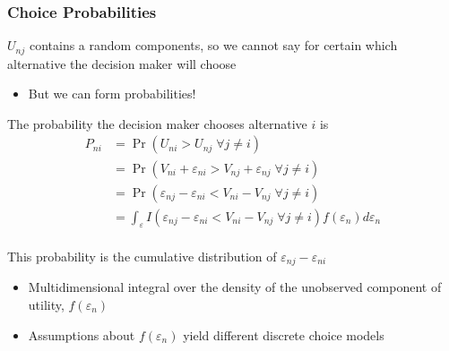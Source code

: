 \documentclass{beamer}
\begin{document}
\begin{frame}\frametitle{Choice Probabilities}
    $U_{nj}$ contains a random components, so we cannot say for certain which alternative the decision maker will choose
    \begin{itemize}
    	\item But we can form probabilities!
    \end{itemize}
    \vspace{1ex}
    The probability the decision maker chooses alternative $i$ is
    \begin{align*}
    	P_{ni} &= \Pr(U_{ni} > U_{nj} \; \forall j \neq i) \\
    	&= \Pr(V_{ni} + \varepsilon_{ni} > V_{nj} + \varepsilon_{nj} \; \forall j \neq i) \\
    	&= \Pr(\varepsilon_{nj} - \varepsilon_{ni} < V_{ni} - V_{nj} \; \forall j \neq i) \\
    	&= \int_\varepsilon I(\varepsilon_{nj} - \varepsilon_{ni} < V_{ni} - V_{nj} \; \forall j \neq i) f(\varepsilon_n) d\varepsilon_n
    \end{align*} \\
    \vspace{1ex}
    This probability is the cumulative distribution of $\varepsilon_{nj} - \varepsilon_{ni}$
    \begin{itemize}
    	\item Multidimensional integral over the density of the unobserved component of utility, $f(\varepsilon_n)$
    	\item Assumptions about $f(\varepsilon_n)$ yield different discrete choice models
    \end{itemize}
\end{frame}
\end{document}
